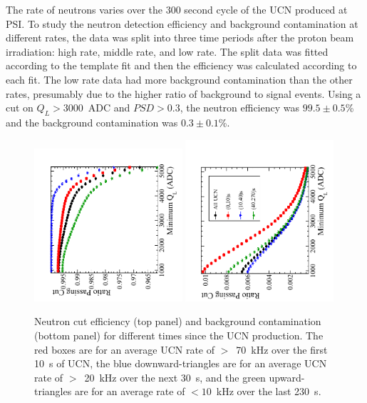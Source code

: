\documentclass[review]{elsarticle}
\begin{document}
The rate of neutrons varies over the 300 second cycle of the UCN
produced at PSI.  To study the neutron detection efficiency and
background contamination at different rates, the data was split into
three time periods after the proton beam irradiation: high rate,
middle rate, and low rate.  The split data was fitted according to the
template fit and then the efficiency was calculated according to each
fit.  The low rate data had more background contamination than the
other rates, presumably due to the higher ratio of background to
signal events.  Using a cut on $Q_L > 3000$~ADC and $PSD>0.3$, the
neutron efficiency was $99.5\pm0.5$\% and the background contamination
was $0.3\pm0.1$\%.

\begin{figure}[!htpb]
\centering \includegraphics[width = 0.49\textwidth, angle=-90]{figures/neutronEffLayered.pdf}
\centering \includegraphics[width = 0.49\textwidth, angle=-90]{figures/backgroundContLayered.pdf}
\caption{ Neutron cut efficiency (top panel) and background
  contamination (bottom panel) for different times since the UCN
  production.  The red boxes are for an average UCN rate of $>$~70~kHz
  over the first 10~s of UCN, the blue downward-triangles are for an
  average UCN rate of $>$~20~kHz over the next 30~s, and the green
  upward-triangles are for an average rate of $<10$~kHz over the last
  230~s.}
\label{fig:detectionEffLayered}
\end{figure}
\end{document}

